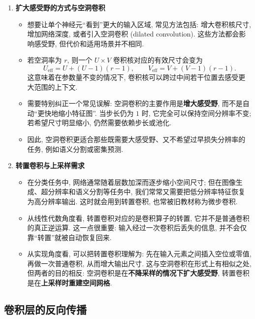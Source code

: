 \documentclass{../nndlcourse}
\begin{document}
\begin{enumerate}
    \item \textbf{扩大感受野的方式与空洞卷积}
    \begin{itemize}
        \item 想要让单个神经元“看到”更大的输入区域, 常见方法包括: 增大卷积核尺寸, 增加网络深度, 或者引入空洞卷积 (dilated convolution). 这些方法都会影响感受野, 但代价和适用场景并不相同.
        \item 若空洞率为 $r$, 则一个 $U \times V$ 卷积核对应的有效尺寸会变为
        \begin{equation*}
            U_{\mathrm{eff}} = U + (U - 1)(r - 1),
            \qquad
            V_{\mathrm{eff}} = V + (V - 1)(r - 1).
        \end{equation*}
        这意味着在参数量不变的情况下, 卷积核可以跨过中间若干位置去感受更大范围的上下文.
        \item 需要特别纠正一个常见误解: 空洞卷积的主要作用是\textbf{增大感受野}, 而不是自动“更快地缩小特征图”. 当步长仍为 $1$ 时, 它完全可以保持空间分辨率不变; 若希望尺寸明显缩小, 仍然需要依赖步长或池化.
        \item 因此, 空洞卷积更适合那些既需要大感受野、又不希望过早损失分辨率的任务, 例如语义分割或密集预测.
    \end{itemize}

    \item \textbf{转置卷积与上采样需求}
    \begin{itemize}
        \item 在分类任务中, 网络通常随着层数加深而逐步缩小空间尺寸; 但在图像生成、超分辨率和语义分割等任务中, 我们常常又需要把低分辨率特征恢复为高分辨率输出. 这时就会用到转置卷积, 也常被旧教材称为微步卷积.
        \item 从线性代数角度看, 转置卷积对应的是卷积算子的转置, 它并不是普通卷积的真正逆运算. 这一点很重要: 输入经过一次卷积后丢失的信息, 并不会仅靠“转置”就被自动恢复回来.
        \item 从实现角度看, 可以把转置卷积理解为: 先在输入元素之间插入空位或零值, 再做一次普通卷积, 从而增大输出尺寸. 这与空洞卷积在形式上有相似之处, 但两者的目的相反: 空洞卷积是在\textbf{不降采样的情况下扩大感受野}, 转置卷积是在\textbf{上采样时重建空间网格}.
    \end{itemize}
\end{enumerate}

\subsection{卷积层的反向传播}
\end{document}
